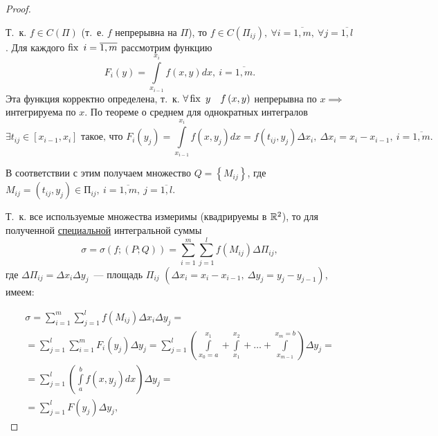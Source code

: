 \documentclass[../../main.tex]{subfiles}
\begin{document}
\begin{proof}
\begin{center}
	\end{center}
 
 	Т.~к. $ f \in C(\Pi)$ (т.~е. $f$ непрерывна на 
 	$\Pi$), то $ f \in C( \Pi_{ij} ),\ 
 	\forall i = \overline{1, m},\ \forall j = \overline{1, l}$. Для каждого 
 	$\operatorname{fix}\ i = \overline{1, m} $ рассмотрим функцию \[F_i \left( y \right) = 
 	\int\limits_{ x_{i - 1} } ^ {x_i} f \left( x, y \right) dx,\  
 	i = \overline{1, m}.\]
 	Эта функция корректно определена, 
 	т.~к. $ \forall \fix\ y\quad f \left( x, y\right) $
 	непрерывна по $x \implies$ интегрируема по $x$. По теореме о среднем
 	для однократных интегралов \[\exists t_{ij} \in 
 	\left[ x_{i - 1}, x_i \right] \text{ такое, что } F_i \left( y_j \right) = 
 	\int\limits_{x_{i - 1} } ^ {x_i} f \left( x, y_j \right) dx = 
 	f \left(  t_{ij}, y_j \right) \Delta x_i,\ 
    \Delta x_i = x_i - x_{i - 1},\ 
 	i = \overline{1, m}.\]
 	
 	В соответствии с этим получаем множество 
 	$Q = \left\lbrace M_{ij} \right\rbrace$,
 	где $ M_{ij} = \left( t_{ij}, y_j \right) \in \text{П}_{ij},\  
 	i = \overline{1, m},\  
 	j = \overline{1, l}$.
 	
 	Т.~к. все используемые множества измеримы (квадрируемы в $ \mathbb{R}^2 $), 
 	то для полученной \underline{специальной} интегральной суммы
 	\begin{equation}
 	\label{lec_13, num_14}
 	\sigma = \sigma \left( f; \left( P; Q \right) \right) = 
 	\sum\limits_{i = 1}^m 
 	\sum\limits_{j = 1}^l f \left( M_{ij} \right) \Delta \Pi_{ij},
 	\end{equation}
 	где $\Delta \Pi_{ij} = \Delta x_i \Delta y_j$~---  
 	площадь $\Pi_{ij}$ 
 	$(\Delta x_i = x_i - x_{i-1},\ \Delta y_j = y_j - y_{j - 1})$,
 	имеем:
 	
 	\begin{equation}
 	\begin{gathered}
 	\sigma = \sum\limits_{i = 1}^m 
 	\sum\limits_{j = 1}^l f \left( M_{ij} \right) \Delta x_i \Delta y_j = \\
 	= \sum\limits_{j = 1}^l 
 	\sum\limits_{i = 1}^m F_i \left( y_j \right) \Delta y_j = 
 	\sum\limits_{j = 1}^l \left( 
 	\int\limits_{x_0 = a}^{ x_1 } + \int\limits_{x_1}^{ x_2 } + \dots + 
 	\int\limits_{ x_{m-1} }^{x_m = b} \right) \Delta y_j = \\
 	= \sum\limits_{j = 1}^l \left( \int\limits_a^b f 
 	\left( x, y_j\right) dx \right) \Delta y_j = \\
 	\label{lec_13, num_15}
 	= \sum\limits_{j = 1}^l F \left( y_j \right) \Delta y_j,
 	\end{gathered}
 	\end{equation}
 	

\end{proof}
\end{document}
